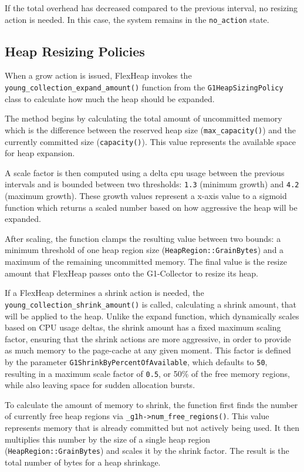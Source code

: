 If the total overhead has decreased compared to the previous interval, no resizing action is needed. In this case, 
the system remains in the \texttt{no\_action} state.

\subsection{Heap Resizing Policies}

When a grow action is issued, FlexHeap invokes the \texttt{young\_collection\_expand\_amount()} function from 
the \texttt{G1HeapSizingPolicy} class to calculate how much the heap should be expanded.

The method begins by calculating the total amount of uncommitted memory which is the difference
between the reserved heap size (\texttt{max\_capacity()}) and the currently committed size 
(\texttt{capacity()}). This value represents the available space for heap expansion.

A scale factor is then computed using a delta cpu usage between the previous intervals and is bounded between two thresholds: \texttt{1.3} 
(minimum growth) and \texttt{4.2} (maximum growth). These growth values represent a x-axis value to a sigmoid
function which returns a scaled number based on how aggressive the heap will be expanded.

After scaling, the function clamps the resulting value between two bounds: a minimum threshold of one heap region size 
(\texttt{HeapRegion::GrainBytes}) and a maximum of the remaining uncommitted memory. 
The final value is the resize amount that FlexHeap passes onto the G1-Collector to resize its heap.

If a FlexHeap determines a shrink action is needed, the \texttt{young\_collection\_shrink\_amount()} is called, calculating a shrink amount,
that will be applied to the heap. Unlike the expand function, 
which dynamically scales based on CPU usage deltas, the shrink amount has a fixed maximum scaling factor, ensuring that the
shrink actions are more aggressive, in order to provide as much memory to the page-cache at any given moment. 
This factor is defined by the parameter \texttt{G1ShrinkByPercentOfAvailable}, 
which defaults to \texttt{50}, resulting in a maximum scale factor of \texttt{0.5}, or 50\% of the free memory regions,
while also leaving space for sudden allocation bursts.

To calculate the amount of memory to shrink, the function first finds the number of currently free heap 
regions via \texttt{\_g1h->num\_free\_regions()}. This value represents memory that is already committed but 
not actively being used. It then multiplies this number by the size of a single heap region (\texttt{HeapRegion::GrainBytes})
and scales it by the shrink factor. The result is the total number of bytes for a heap shrinkage.

